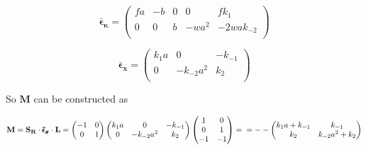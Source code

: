 \documentclass{article}
\begin{document}
	\begin{center}
		\begin{equation}
			\pmb{\bar{\epsilon}_{\kappa}} = \begin{pmatrix}
				f a & -b & 0 & 0 & f k_1 \\
				0 & 0 & b & - w a^2 & -2wak_{-2}\\
			\end{pmatrix}
		\end{equation}
	\end{center}
	
	
	\begin{center}
		\begin{equation}
			\pmb{\bar{\epsilon}_{x}} = \begin{pmatrix}
				k_1 a & 0 & -k_{-1} \\
				0 & -k_{-2} a^2 & k_2 \\
			\end{pmatrix}
		\end{equation}
	\end{center}
	
	\begin{flushleft}
		So $\mathbf{M}$ can be constructed as
	\end{flushleft}
	
	\begin{center}
		\begin{equation}
			\mathbf{M} = \mathbf{S_R} \cdot \pmb{\bar{\epsilon}_{x}} \cdot \mathbf{L} =  \begin{pmatrix}
				-1 & 0 \\
				0 & 1
			\end{pmatrix}
			\begin{pmatrix}
				k_1 a & 0 & -k_{-1} \\
				0 & -k_{-2} a^2 & k_2 \\
			\end{pmatrix}
			\begin{pmatrix}
				1 & 0 \\
				0 & 1 \\
				-1 & -1
			\end{pmatrix} = \\
			= --
			\begin{pmatrix}
				k_1 a + k_{-1} & k_{-1} \\
				k_2 & k_{-2} a^2 + k_2 
			\end{pmatrix}
			
		\end{equation}
	\end{center}
	
\end{document}
